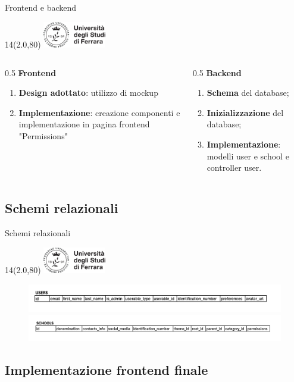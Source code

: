 \documentclass[11pt,xcolor={dvipsnames}]{beamer} %
\newcommand{\MyLogo}{%
\begin{textblock}{14}(2.0,80)
 \includegraphics[height=1.15cm, angle=0]{logo}
\end{textblock}
}
\begin{document}
\begin{frame}{Frontend e backend}
	\transboxin
	\MyLogo
	\begin{columns}[T] %
		\begin{column}{0.5\textwidth}
			\textbf{Frontend}
			\begin{enumerate}
				\item \textbf{Design adottato}: utilizzo di mockup
				\item \textbf{Implementazione}: creazione componenti e implementazione in pagina frontend "Permissions"
			\end{enumerate}
		\end{column}
		\begin{column}{0.5\textwidth}
			\textbf{Backend}
			\begin{enumerate}
				\item \textbf{Schema} del database;
				\item \textbf{Inizializzazione} del database;
				\item \textbf{Implementazione}: modelli user e school e controller user.
			\end{enumerate}
		\end{column}
	\end{columns}
\end{frame}

\subsection{Schemi relazionali}

\begin{frame}{Schemi relazionali}
	\transglitter
	\MyLogo
	\begin{figure}
		\centering
		\includegraphics[width=\textwidth]{../images/schema-relazionale-users.png}
		\includegraphics[width=\textwidth]{../images/schema-relazionale-schools.png}
	\end{figure}
\end{frame}

\subsection{Implementazione frontend finale}
\end{document}
